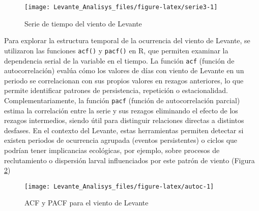 \documentclass[
]{article}
\newenvironment{Shaded}{\begin{snugshade}}{\end{snugshade}}
\newcommand{\AttributeTok}[1]{\textcolor[rgb]{0.13,0.29,0.53}{#1}}
\newcommand{\CommentTok}[1]{\textcolor[rgb]{0.56,0.35,0.01}{\textit{#1}}}
\newcommand{\DecValTok}[1]{\textcolor[rgb]{0.00,0.00,0.81}{#1}}
\newcommand{\FunctionTok}[1]{\textcolor[rgb]{0.13,0.29,0.53}{\textbf{#1}}}
\newcommand{\NormalTok}[1]{#1}
\newcommand{\OtherTok}[1]{\textcolor[rgb]{0.56,0.35,0.01}{#1}}
\newcommand{\SpecialCharTok}[1]{\textcolor[rgb]{0.81,0.36,0.00}{\textbf{#1}}}
\begin{document}
\begin{Shaded}
\end{Shaded}

\begin{figure}

{\centering \texttt{[image: Levante\_Analisys\_files/figure-latex/serie3-1]} 

}

\caption{Serie de tiempo del viento de Levante}\label{fig:serie3}
\end{figure}

Para explorar la estructura temporal de la ocurrencia del viento de Levante, se utilizaron las funciones \texttt{acf()} y \texttt{pacf()} en R, que permiten examinar la dependencia serial de la variable en el tiempo. La función \texttt{acf} (función de autocorrelación) evalúa cómo los valores de días con viento de Levante en un periodo se correlacionan con sus propios valores en rezagos anteriores, lo que permite identificar patrones de persistencia, repetición o estacionalidad. Complementariamente, la función \texttt{pacf} (función de autocorrelación parcial) estima la correlación entre la serie y sus rezagos eliminando el efecto de los rezagos intermedios, siendo útil para distinguir relaciones directas a distintos desfases. En el contexto del Levante, estas herramientas permiten detectar si existen periodos de ocurrencia agrupada (eventos persistentes) o ciclos que podrían tener implicancias ecológicas, por ejemplo, sobre procesos de reclutamiento o dispersión larval influenciados por este patrón de viento (Figura \ref{fig:autoc})

\begin{figure}

{\centering \texttt{[image: Levante\_Analisys\_files/figure-latex/autoc-1]} 

}

\caption{ACF y PACF para el viento de Levante}\label{fig:autoc}
\end{figure}
\end{document}
